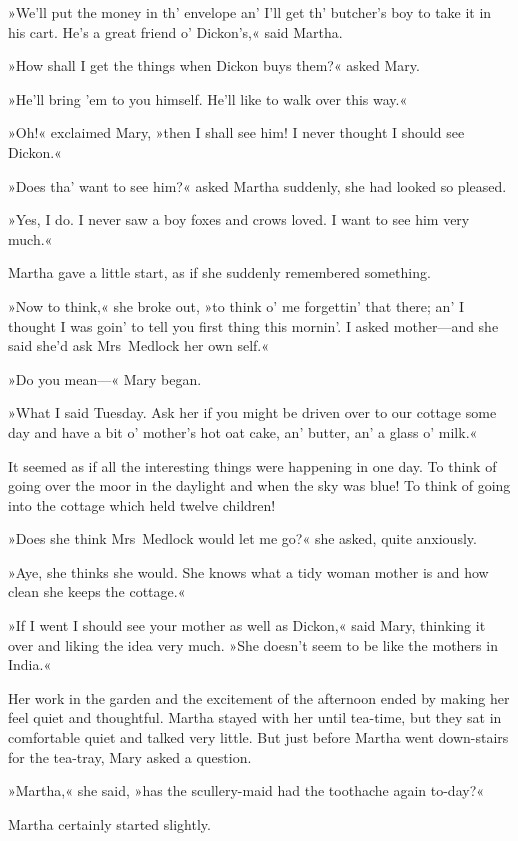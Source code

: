 »We'll put the money in th' envelope an' I'll get th' butcher's boy to take it in his cart. He's a great friend o' Dickon's,« said Martha.

»How shall I get the things when Dickon buys them?« asked Mary.

»He'll bring 'em to you himself. He'll like to walk over this way.«

»Oh!« exclaimed Mary, »then I shall see him! I never thought I should see Dickon.«

»Does tha' want to see him?« asked Martha suddenly, she had looked so pleased.

»Yes, I do. I never saw a boy foxes and crows loved. I want to see him very much.«

Martha gave a little start, as if she suddenly remembered something.

»Now to think,« she broke out, »to think o' me forgettin' that there; an' I thought I was goin' to tell you first thing this mornin'. I asked mother—and she said she'd ask Mrs~Medlock her own self.«

»Do you mean—« Mary began.

»What I said Tuesday. Ask her if you might be driven over to our cottage some day and have a bit o' mother's hot oat cake, an' butter, an' a glass o' milk.«

It seemed as if all the interesting things were happening in one day. To think of going over the moor in the daylight and when the sky was blue! To think of going into the cottage which held twelve children!

»Does she think Mrs~Medlock would let me go?« she asked, quite anxiously.

»Aye, she thinks she would. She knows what a tidy woman mother is and how clean she keeps the cottage.«

»If I went I should see your mother as well as Dickon,« said Mary, thinking it over and liking the idea very much. »She doesn't seem to be like the mothers in India.«

Her work in the garden and the excitement of the afternoon ended by making her feel quiet and thoughtful. Martha stayed with her until tea-time, but they sat in comfortable quiet and talked very little. But just before Martha went down-stairs for the tea-tray, Mary asked a question.

»Martha,« she said, »has the scullery-maid had the toothache again to-day?«

Martha certainly started slightly.

